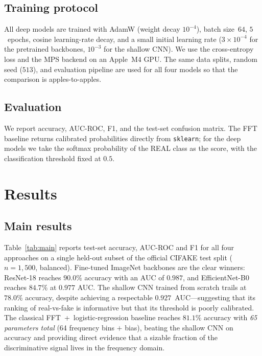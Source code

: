 \documentclass{article}
\begin{document}
\subsection{Training protocol}

All deep models are trained with AdamW (weight decay $10^{-4}$), batch
size~$64$, $5$~epochs, cosine learning-rate decay, and a small initial
learning rate ($3\times10^{-4}$ for the pretrained backbones,
$10^{-3}$ for the shallow CNN). We use the cross-entropy loss and the
\textsc{MPS} backend on an Apple~M4 GPU. The same data splits, random
seed ($513$), and evaluation pipeline are used for all four models so
that the comparison is apples-to-apples.

\subsection{Evaluation}

We report accuracy, AUC-ROC, F1, and the test-set confusion matrix.
The FFT baseline returns calibrated probabilities directly from
\texttt{sklearn}; for the deep models we take the softmax probability
of the \textsc{REAL} class as the score, with the classification
threshold fixed at $0.5$.

\section{Results}
\label{sec:results}

\subsection{Main results}

Table~\ref{tab:main} reports test-set accuracy, AUC-ROC and F1 for all
four approaches on a single held-out subset of the official
\textsc{CIFAKE} test split ($n{=}1{,}500$, balanced). Fine-tuned
ImageNet backbones are the clear winners: \mbox{ResNet-18} reaches
$90.0\%$ accuracy with an AUC of $0.987$, and \mbox{EfficientNet-B0}
reaches $84.7\%$ at $0.977$ AUC. The shallow CNN trained from scratch
trails at $78.0\%$ accuracy, despite achieving a respectable
$0.927$~AUC---suggesting that its ranking of real-vs-fake is
informative but that its threshold is poorly calibrated. The classical
FFT~+~logistic-regression baseline reaches $81.1\%$ accuracy with
\emph{65 parameters total} (64 frequency bins $+$ bias), beating the
shallow CNN on accuracy and providing direct evidence that a sizable
fraction of the discriminative signal lives in the frequency domain.
\end{document}
